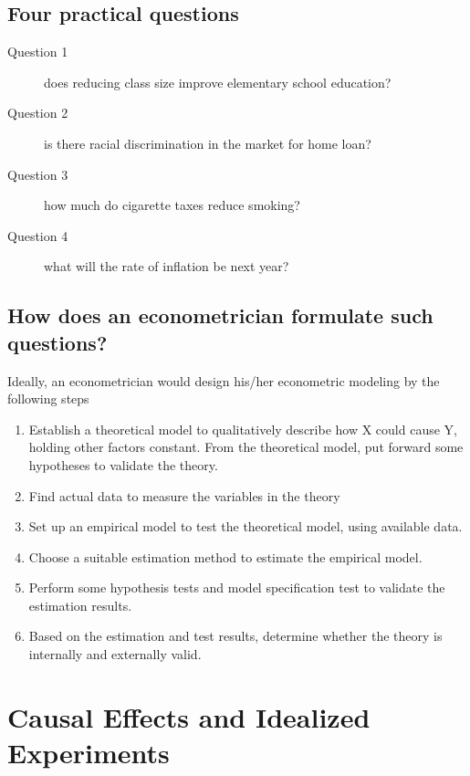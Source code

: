 \documentclass[a4paper,11pt]{article}
\begin{document}
\subsection{Four practical questions}
\label{sec:org13400d8}

\begin{description}
\item[{Question 1}] does reducing class size improve elementary school education?

\item[{Question 2}] is there racial discrimination in the market for home loan?

\item[{Question 3}] how much do cigarette taxes reduce smoking?

\item[{Question 4}] what will the rate of inflation be next year?
\end{description}


\subsection{How does an econometrician formulate such questions?}
\label{sec:orgd61830c}

Ideally, an econometrician would design his/her econometric modeling
by the following steps

\begin{enumerate}
\item Establish a theoretical model to qualitatively describe how X could
cause Y, holding other factors constant. From the theoretical
model, put forward some hypotheses to validate the theory.
\item Find actual data to measure the variables in the theory
\item Set up an empirical model to test the theoretical model, using
available data.
\item Choose a suitable estimation method to estimate the empirical model.
\item Perform some hypothesis tests and model specification test to
validate the estimation results.
\item Based on the estimation and test results, determine whether the theory
is internally and externally valid.
\end{enumerate}


\section{Causal Effects and Idealized Experiments}
\label{sec:org4880463}
\end{document}
